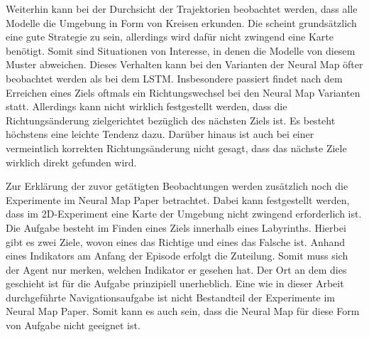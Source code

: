 Weiterhin kann bei der Durchsicht der Trajektorien beobachtet werden, dass alle Modelle die Umgebung in Form von Kreisen erkunden. Die scheint grundsätzlich eine gute Strategie zu sein, allerdings wird dafür nicht zwingend eine Karte benötigt. Somit sind Situationen von Interesse, in denen die Modelle von diesem Muster abweichen. Dieses Verhalten kann bei den Varianten der Neural Map öfter beobachtet werden als bei dem LSTM. Insbesondere passiert findet nach dem Erreichen eines Ziels oftmals ein Richtungswechsel bei den Neural Map Varianten statt. Allerdings kann nicht wirklich festgestellt werden, dass die Richtungsänderung zielgerichtet bezüglich des nächsten Ziels ist. Es besteht höchstens eine leichte Tendenz dazu. Darüber hinaus ist auch bei einer vermeintlich korrekten Richtungsänderung nicht gesagt, dass das nächste Ziele wirklich direkt gefunden wird.

Zur Erklärung der zuvor getätigten Beobachtungen werden zusätzlich noch die Experimente im Neural Map Paper betrachtet. Dabei kann festgestellt werden, dass im 2D-Experiment eine Karte der Umgebung nicht zwingend erforderlich ist. Die Aufgabe besteht im Finden eines Ziels innerhalb eines Labyrinths. Hierbei gibt es zwei Ziele, wovon eines das Richtige und eines das Falsche ist. Anhand eines Indikators am Anfang der Episode erfolgt die Zuteilung. Somit muss sich der Agent nur merken, welchen Indikator er gesehen hat. Der Ort an dem dies geschieht ist für die Aufgabe prinzipiell unerheblich. Eine wie in dieser Arbeit durchgeführte Navigationsaufgabe ist nicht Bestandteil der Experimente im Neural Map Paper. Somit kann es auch sein, dass die Neural Map für diese Form von Aufgabe nicht geeignet ist.

